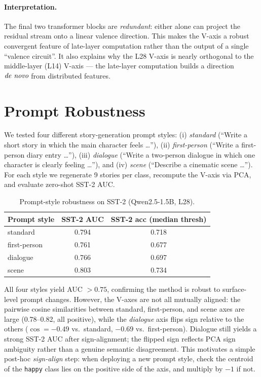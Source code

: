 \paragraph{Interpretation.}
The final two transformer blocks are \emph{redundant}: either alone
can project the residual stream onto a linear valence direction. This
makes the V-axis a robust convergent feature of late-layer computation
rather than the output of a single ``valence circuit''. It also
explains why the L28 V-axis is nearly orthogonal to the middle-layer
(L14) V-axis --- the late-layer computation builds a direction
$\emph{de novo}$ from distributed features.

\section{Prompt Robustness}
\label{sup:promptrobust}

We tested four different story-generation prompt styles:
(i) \emph{standard} (``Write a short story in which the main character
feels \ldots''), (ii) \emph{first-person} (``Write a first-person diary
entry \ldots''), (iii) \emph{dialogue} (``Write a two-person dialogue in
which one character is clearly feeling \ldots''), and (iv) \emph{scene}
(``Describe a cinematic scene \ldots''). For each style we regenerate 9
stories per class, recompute the V-axis via PCA, and evaluate zero-shot
SST-2 AUC.

\begin{table}[h]
\centering
\caption{Prompt-style robustness on SST-2 (Qwen2.5-1.5B, L28).}
\label{tab:sup_prompt_robust}
\begin{tabular}{lcc}
\toprule
Prompt style & SST-2 AUC & SST-2 acc (median thresh) \\
\midrule
standard      & 0.794 & 0.718 \\
first-person  & 0.761 & 0.677 \\
dialogue      & 0.766 & 0.697 \\
scene         & 0.803 & 0.734 \\
\bottomrule
\end{tabular}
\end{table}

All four styles yield AUC $> 0.75$, confirming the method is robust to
surface-level prompt changes. However, the V-axes are not all mutually
aligned: the pairwise cosine similarities between standard,
first-person, and scene axes are large (0.78--0.82, all positive),
while the \emph{dialogue} axis flips sign relative to the others
($\cos = -0.49$ vs.\ standard, $-0.69$ vs.\ first-person). Dialogue
still yields a strong SST-2 AUC after sign-alignment; the flipped sign
reflects PCA sign ambiguity rather than a genuine semantic disagreement.
This motivates a simple post-hoc \emph{sign-align} step: when deploying a
new prompt style, check the centroid of the \texttt{happy} class lies on
the positive side of the axis, and multiply by $-1$ if not.

